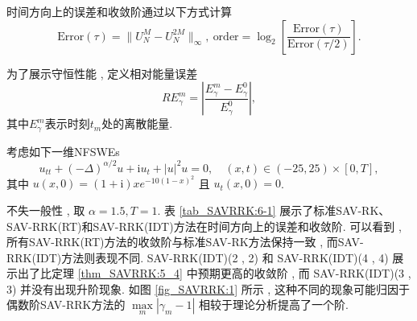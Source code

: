 时间方向上的误差和收敛阶通过以下方式计算
\begin{equation}
	\text{Error}(\tau) = \|U_{N}^{M} - U_{N}^{2 M}\|_{\infty} , ~\text{order} = \log_{2}\left[\frac{\text{Error}(\tau)}{\text{Error}(\tau / 2)}\right].\label{eq_SAVRRK:104}
\end{equation}

为了展示守恒性能 , 定义相对能量误差
\begin{equation}\label{eq_SAVRRK:105}
	R E_{\gamma}^{m} = \left|\frac{E_{\gamma}^{m} - E_{\gamma}^{0}}{E_{\gamma}^{0}}\right| , 
\end{equation}
其中$E_{\gamma}^{m}$表示时刻$t_m$处的离散能量.

\begin{example}\label{exp_SAVRRK:1} 
	考虑如下一维NFSWEs\cite{ranLinearlyImplicitConservative2016}
	\begin{equation}\label{eq_SAVRRK:108}
		u_{t t}+(-\Delta)^{\alpha / 2} u+\mathrm{i}u_t+|u|^2 u=0 , \quad (x , t)\in  (-25 , 25)\times[0 , T] , 
	\end{equation}
	其中 $u(x , 0)=(1+\mathrm{i}) x e^{-10(1-x)^2}$ 且 $u_t(x , 0)=0$.
	\end{example}

	不失一般性 , 取 $\alpha=1.5,T=1$.%
	表 \ref{tab_SAVRRK:6-1} 展示了标准SAV-RK、SAV-RRK(RT)和SAV-RRK(IDT)方法在时间方向上的误差和收敛阶.
	可以看到 , 所有SAV-RRK(RT)方法的收敛阶与标准SAV-RK方法保持一致 , 而SAV-RRK(IDT)方法则表现不同.
	SAV-RRK(IDT)(2 , 2) 和 SAV-RRK(IDT)(4 , 4) 展示出了比定理 \ref{thm_SAVRRK:5_4} 中预期更高的收敛阶 , 
	而 SAV-RRK(IDT)(3 , 3) 并没有出现升阶现象. 如图 \ref{fig_SAVRRK:1} 所示 , 
	这种不同的现象可能归因于偶数阶SAV-RRK方法的 $\max\limits _m\left|\gamma_m-1\right|$ 
	相较于理论分析提高了一个阶.

